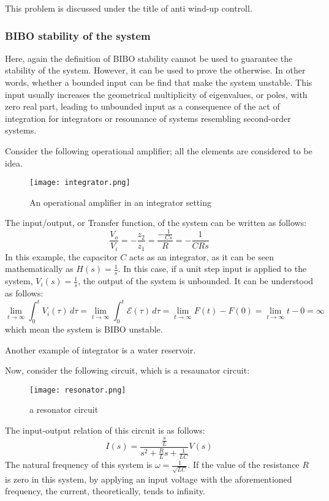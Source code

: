\begin{QandAbox}
This problem is discussed under the title of anti wind-up controll.
\end{QandAbox}


\subsubsection{BIBO stability of the system}
Here, again the definition of BIBO stability cannot be used to guarantee the stability of the system. However, it can be used to prove the otherwise. In other words, whether a bounded input can be find that make the system unstable. This input usually increases the geometrical multiplicity of eigenvalues, or poles, with zero real part, leading to unbounded input as a consequence of the act of integration for integrators or resounance of systems resembling second-order systems.
\begin{example}
Consider the following operational amplifier; all the elements are considered to be idea.
\begin{figure}[H]
    \centering
    \texttt{[image: integrator.png]}
    \caption{An operational amplifier in an integrator setting}
    \label{fig:integrator}
\end{figure}
The input/output, or Transfer function, of the system can be written as follows:
\[
\frac{V_o}{V_i} = -\frac{z_2}{z_1} = \frac{-\frac{1}{Cs}}{R} = -\frac{1}{CRs}
\]
In this example, the capacitor \(C\) acts as an integrator, as it can be seen mathematically as \(H(s) = \frac{1}{s}\). In this case, if a unit step input is applied to the system, \(V_i(s) = \frac{1}{s}\), the output of the system is unbounded. It can be understood as follows:
\[
\lim_{t \to \infty} \int_{0}^{t} V_i(\tau) \, d\tau = 
\lim_{t \to \infty} \int_{0}^{t} \mathcal{E}(\tau) \, d\tau =
\lim_{t \to \infty} F(t) - F(0) = \lim_{t \to \infty} t - 0 = \infty
\]
which mean the system is BIBO unstable.
\end{example}
\begin{example}
Another example of integrator is a water reservoir.

Now, consider the following circuit, which is a resaunator circuit:

\begin{figure}[H]
    \centering
    \texttt{[image: resonator.png]}
    \caption{a resonator circuit}
    \label{fig:resonator}
\end{figure}
The input-output relation of this circuit is as follows:
\[
I(s) = \frac{\frac{s}{L}}{s^2 + \frac{R}{L}s + \frac{1}{LC}} V(s)
\]
The natural frequency of this system is \(\omega = \frac{1}{\sqrt{LC}}\). If the value of the resistance \(R\) is zero in this system, by applying an input voltage with the aforementioned frequency, the current, theoretically, tends to infinity. 
\end{example}


